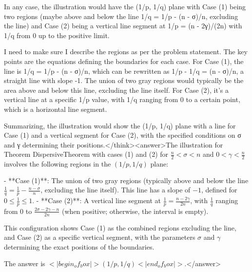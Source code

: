 In any case, the illustration would have the (1/p, 1/q) plane with Case (1) being two regions (maybe above and below the line 1/q = 1/p - (n - σ)/n, excluding the line) and Case (2) being a vertical line segment at 1/p = (n - 2γ)/(2n) with 1/q from 0 up to the positive limit. 

I need to make sure I describe the regions as per the problem statement. The key points are the equations defining the boundaries for each case. For Case (1), the line is 1/q = 1/p - (n - σ)/n, which can be rewritten as 1/p - 1/q = (n - σ)/n, a straight line with slope -1. The union of two gray regions would typically be the area above and below this line, excluding the line itself. For Case (2), it's a vertical line at a specific 1/p value, with 1/q ranging from 0 to a certain point, which is a horizontal line segment. 

Summarizing, the illustration would show the (1/p, 1/q) plane with a line for Case (1) and a vertical segment for Case (2), with the specified conditions on σ and γ determining their positions.</think><answer>The illustration for Theorem {DispersiveTheorem} with cases (1) and (2) for \( \frac{n}{2} < \sigma < n \) and \( 0 < \gamma < \frac{n}{2} \) involves the following regions in the \((1/p, 1/q)\) plane:  

- **Case (1)**: The union of two gray regions (typically above and below the line \( \frac{1}{q} = \frac{1}{p} - \frac{n - \sigma}{n} \), excluding the line itself). This line has a slope of \(-1\), defined for \( 0 \leq \frac{1}{p} \leq 1 \).  
- **Case (2)**: A vertical line segment at \( \frac{1}{p} = \frac{n - 2\gamma}{2n} \), with \( \frac{1}{q} \) ranging from \( 0 \) to \( \frac{2\sigma - 2\gamma - n}{2n} \) (when positive; otherwise, the interval is empty).  

This configuration shows Case (1) as the combined regions excluding the line, and Case (2) as a specific vertical segment, with the parameters \( \sigma \) and \( \gamma \) determining the exact positions of the boundaries.  

The answer is \(<|begin_of_box|>(1/p, 1/q)<|end_of_box|>\).</answer>